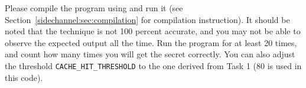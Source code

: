 Please compile the program using and run it (see Section~\ref{sidechannel:sec:compilation}
for compilation instruction).
It should be noted that the technique is not 100 percent accurate, and you may not 
be able to observe the expected output all the time. 
Run the program for at least 20 times, and count how many times 
you will get the secret correctly. You can also adjust the 
threshold \texttt{CACHE\_HIT\_THRESHOLD} to the one derived from
Task 1 (80 is used in this code). 


